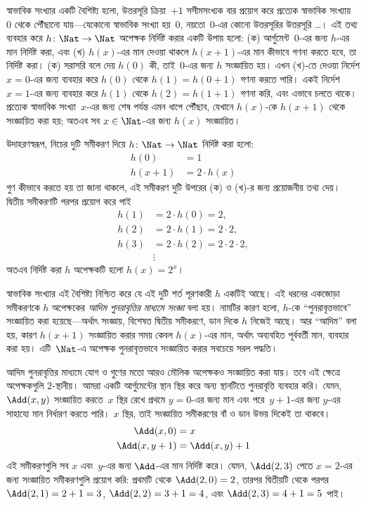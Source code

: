 \documentclass[../../../include/open-logic-section]{subfiles}
\begin{document}

স্বাভাবিক সংখ্যার একটি বৈশিষ্ট্য হলো, উত্তরসূরি ক্রিয়া~$+1$ সসীমসংখ্যক
বার প্রয়োগ করে প্রত্যেক স্বাভাবিক সংখ্যায়~$0$ থেকে পৌঁছানো যায়—যেকোনো
স্বাভাবিক সংখ্যা হয়~$0$, নয়তো~$0$-এর কোনো উত্তরসূরির উত্তরসূরি
\dots{}। এই তথ্য ব্যবহার করে $h\colon\Nat \to \Nat$ অপেক্ষক নির্দিষ্ট
করার একটি উপায় হলো: (ক) আর্গুমেন্ট~$0$-এর জন্য $h$-এর মান নির্দিষ্ট করা,
এবং (খ) $h(x)$-এর মান দেওয়া থাকলে $h(x+1)$-এর মান কীভাবে গণনা করতে হবে,
তা নির্দিষ্ট করা। (ক) সরাসরি বলে দেয় $h(0)$ কী, তাই~$0$-এর জন্য
$h$ সংজ্ঞায়িত হয়। এখন (খ)-তে দেওয়া নির্দেশ $x=0$-এর জন্য ব্যবহার করে
$h(0)$ থেকে $h(1)=h(0+1)$ গণনা করতে পারি। একই নির্দেশ $x=1$-এর জন্য
ব্যবহার করে $h(1)$ থেকে $h(2)=h(1+1)$ গণনা করি, এবং এভাবে চলতে থাকে।
প্রত্যেক স্বাভাবিক সংখ্যা~$x$-এর জন্য শেষ পর্যন্ত এমন ধাপে পৌঁছাব, যেখানে
$h(x)$-কে $h(x+1)$ থেকে সংজ্ঞায়িত করা হয়; অতএব সব $x\in\Nat$-এর জন্য
$h(x)$ সংজ্ঞায়িত।

উদাহরণস্বরূপ, নিচের দুটি সমীকরণ দিয়ে $h\colon\Nat\to\Nat$ নির্দিষ্ট
করা হলো:
\begin{align*}
h(0) & =  1\\
h(x+1) & =  2 \cdot h(x)
\end{align*}
গুণ কীভাবে করতে হয় তা জানা থাকলে, এই সমীকরণ দুটি উপরের (ক) ও (খ)-র
জন্য প্রয়োজনীয় তথ্য দেয়। দ্বিতীয় সমীকরণটি পরপর প্রয়োগ করে পাই
\begin{align*}
  h(1) & = 2\cdot h(0) = 2,\\
  h(2) & = 2\cdot h(1) = 2\cdot 2,\\
  h(3) & = 2 \cdot h(2) = 2\cdot 2 \cdot 2,\\
  & \vdots
\end{align*}
অতএব নির্দিষ্ট করা $h$ অপেক্ষকটি হলো $h(x)=2^x$।

স্বাভাবিক সংখ্যার এই বৈশিষ্ট্য নিশ্চিত করে যে এই দুটি শর্ত পূরণকারী
$h$ একটিই আছে। এই ধরনের একজোড়া সমীকরণকে $h$ অপেক্ষকের
\emph{আদিম পুনরাবৃত্তির মাধ্যমে সংজ্ঞা} বলা হয়। নামটির কারণ হলো,
$h$-কে “পুনরাবৃত্তভাবে” সংজ্ঞায়িত করা হয়েছে—অর্থাৎ সংজ্ঞায়, বিশেষত
দ্বিতীয় সমীকরণে, ডান দিকে $h$ নিজেই আছে। আর “আদিম” বলা হয়, কারণ
$h(x+1)$ সংজ্ঞায়িত করার সময় কেবল $h(x)$-এর মান, অর্থাৎ অব্যবহিত
পূর্ববর্তী মান, ব্যবহার করা হয়। এটি~$\Nat$-এ অপেক্ষক পুনরাবৃত্তভাবে
সংজ্ঞায়িত করার সবচেয়ে সরল পদ্ধতি।

আদিম পুনরাবৃত্তির মাধ্যমে যোগ ও গুণের মতো আরও মৌলিক অপেক্ষকও
সংজ্ঞায়িত করা যায়। তবে এই ক্ষেত্রে অপেক্ষকগুলি $2$-স্থানীয়। আমরা
একটি আর্গুমেন্টের স্থান স্থির করে অন্য স্থানটিতে পুনরাবৃত্তি ব্যবহার করি।
যেমন, $\Add(x,y)$ সংজ্ঞায়িত করতে~$x$ স্থির রেখে প্রথমে $y=0$-এর জন্য
মান এবং পরে~$y+1$-এর জন্য $y$-এর সাহায্যে মান নির্ধারণ করতে পারি।
$x$ স্থির, তাই সংজ্ঞায়িত সমীকরণের বাঁ ও ডান উভয় দিকেই তা থাকবে।
\begin{align*}
\Add(x,0) & =  x\\
\Add(x,y+1) & =  \Add(x,y)+1
\end{align*}
এই সমীকরণগুলি সব $x$ এবং~$y$-এর জন্য $\Add$-এর মান নির্দিষ্ট করে।
যেমন, $\Add(2,3)$ পেতে $x=2$-এর জন্য সংজ্ঞায়িত সমীকরণগুলি প্রয়োগ
করি: প্রথমটি থেকে $\Add(2,0)=2$, তারপর দ্বিতীয়টি থেকে পরপর
$\Add(2,1)=2+1=3$, $\Add(2,2)=3+1=4$, এবং
$\Add(2,3)=4+1=5$ পাই।
\end{document}
